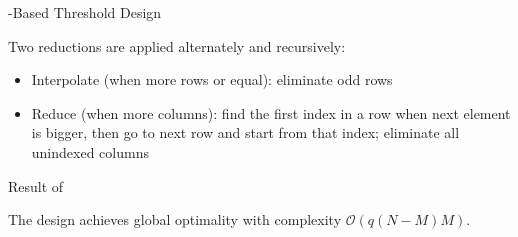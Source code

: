 \documentclass[9pt]{beamer}
\begin{document}
\begin{section}{-Based Threshold Design}
\begin{frame}{}
			\vspace{1em}
			Two reductions are applied alternately and recursively:
			\begin{itemize}
				\item Interpolate (when more rows or equal): eliminate odd rows
				\item Reduce (when more columns): find the first index in a row when next element is bigger, then go to next row and start from that index; eliminate all unindexed columns
			\end{itemize}
		\end{frame}

		\begin{frame}{Result of \cite{He2021}}
			\begin{figure}[!t]
				\centering
			\end{figure}
			The  design achieves global optimality with complexity $\mathcal{O}(q(N-M)M)$.
		\end{frame}
	\end{section}
\end{document}
